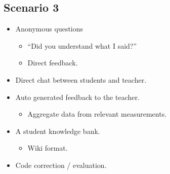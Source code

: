 \newpage
\subsection*{Scenario 3}
\begin{itemize}
\item Anonymous questions
\begin{itemize}
\item ``Did you understand what I said?''
\item Direct feedback.
\end{itemize}
\item Direct chat between students and teacher.
\item Auto generated feedback to the teacher.
\begin{itemize}
\item Aggregate data from relevant measurements.
\end{itemize}
\item A student knowledge bank.
\begin{itemize}
\item Wiki format.
\end{itemize}
\item Code correction / evaluation.
\end{itemize}

\vfill
